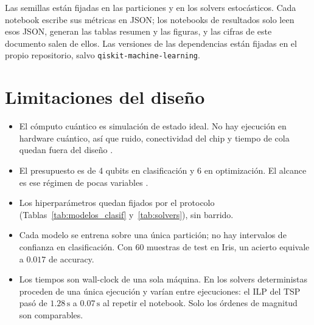 Las semillas están fijadas en las particiones y en los solvers estocásticos. Cada notebook escribe sus métricas en JSON; los notebooks de resultados solo leen esos JSON, generan las tablas resumen y las figuras, y las cifras de este documento salen de ellos. Las versiones de las dependencias están fijadas en el propio repositorio, salvo \texttt{qiskit-machine-learning}.

\section{Limitaciones del diseño}

\begin{itemize}
    \item El cómputo cuántico es simulación de estado ideal. No hay ejecución en hardware cuántico, así que ruido, conectividad del chip y tiempo de cola quedan fuera del diseño \citep{preskill2018}.
    \item El presupuesto es de 4 qubits en clasificación y 6 en optimización. El alcance es ese régimen de pocas variables \citep{thanasilp2022}.
    \item Los hiperparámetros quedan fijados por el protocolo (Tablas~\ref{tab:modelos_clasif} y~\ref{tab:solvers}), sin barrido.
    \item Cada modelo se entrena sobre una única partición; no hay intervalos de confianza en clasificación. Con 60 muestras de test en Iris, un acierto equivale a $0.017$ de accuracy.
    \item Los tiempos son wall-clock de una sola máquina. En los solvers deterministas proceden de una única ejecución y varían entre ejecuciones: el ILP del TSP pasó de $1.28\,\mathrm{s}$ a $0.07\,\mathrm{s}$ al repetir el notebook. Solo los órdenes de magnitud son comparables.
\end{itemize}
